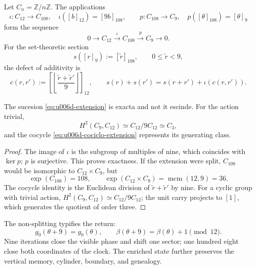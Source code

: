 Let \(C_n=\mathbb Z/n\mathbb Z\). The applications
\begin{equation}
 \iota:C_{12}\longrightarrow C_{108},
 \quad \iota([b]_{12})=[9b]_{108},
 \qquad
 p:C_{108}\longrightarrow C_9,
 \quad p([\theta]_{108})=[\theta]_9
 \label{eq:u006d-mapas-extension}
\end{equation}
form the sequence
\begin{equation}
 0\longrightarrow C_{12}
 \xrightarrow{\;\iota\;}C_{108}
 \xrightarrow{\;p\;}C_9
 \longrightarrow0.
 \label{eq:u006d-extension}
\end{equation}
For the set-theoretic section
\[
 s([r]_9):=[\widetilde r]_{108},
 \qquad 0\leq\widetilde r<9,
\]
the defect of additivity is
\begin{equation}
 c(r,r'):=
 \left[
 \left\lfloor
 \frac{\widetilde r+\widetilde r'}9
 \right\rfloor
 \right]_{12},
 \qquad
 s(r)+s(r')
 =s(r+r')+\iota(c(r,r')).
 \label{eq:u006d-cociclo-extension}
\end{equation}

\begin{theorem}
\label{thm:u006d-extension-no-escindida}
The sucesion \eqref{eq:u006d-extension} is exacta and not it escinde. For the
action trivial,
\begin{equation}
 H^2(C_9,C_{12})
 \simeq C_{12}/9C_{12}
 \simeq C_3,
 \label{eq:u006d-cohomologia-extension}
\end{equation}
and the cocycle \eqref{eq:u006d-cociclo-extension} represents its generating
class.
\end{theorem}

\begin{proof}
The image of \(\iota\) is the subgroup of multiples of nine, which coincides
with \(\ker p\); \(p\) is surjective. This proves exactness. If the
extension were split, \(C_{108}\) would be isomorphic to
\(C_{12}\times C_9\), but
\[
 \exp(C_{108})=108,
 \qquad
 \exp(C_{12}\times C_9)=\operatorname{mcm}(12,9)=36.
\]
The cocycle identity is the Euclidean division of \(\widetilde r+\widetilde r'\) by nine.
For a cyclic group with trivial action, \(H^2(C_9,C_{12})\simeq C_{12}/9C_{12}\); the unit carry
projects to \([1]\), which generates the quotient of order three.
\end{proof}

The non-splitting typifies the return:
\[
 g_0(\theta+9)=g_0(\theta),
 \qquad
 \beta(\theta+9)=\beta(\theta)+1\pmod{12}.
\]
Nine iterations close the visible phase and shift one sector; one hundred
eight close both coordinates of the clock. The enriched state further preserves
the vertical memory, cylinder, boundary, and genealogy.

